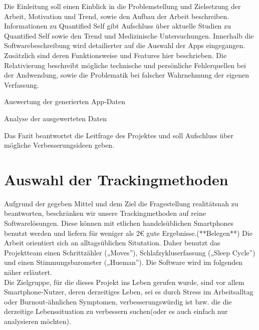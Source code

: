 Die Einleitung soll einen Einblick in die Problemstellung und Zielsetzung der Arbeit, Motivation und Trend, sowie den Aufbau der Arbeit beschreiben.
Informationen zu Quantified Self gibt Aufschluss über aktuelle Studien zu Quantified Self sowie den Trend und Medizinische Untersuchungen.
Innerhalb die Softwarebeschreibung wird detailierter auf die Auswahl der Apps eingegangen. \\
Zusätzlich sind deren Funktionsweise und Features hier beschrieben.
Die Relativierung beschreibt mögliche technische und persönliche Fehlerquellen bei der Andwendung, sowie die Problematik bei falscher Wahrnehmung der eigenen Verfassung.


Auswertung der generierten App-Daten


Analyse der ausgewerteten Daten


Das Fazit beantwortet die Leitfrage des Projektes und soll Aufschluss über mögliche Verbesserungsideen geben.

\section{Auswahl der Trackingmethoden}
\label{ch:Einleitung:sec:auswahl-der-trackingmethoden}

Aufgrund der gegeben Mittel und dem Ziel die Fragestellung realitätsnah zu beantworten, beschränken wir unsere Trackingmethoden auf reine Softwarelösungen. 
Diese können mit etlichen handelsüblichen Smartphones benutzt werden und liefern für weniger als 2\euro{} gute Ergebnisse.(**Belegen**) 
Die Arbeit orientiert sich an alltagsüblichen Situtation. 
Daher benutzt das Projektteam einen Schrittzähler („Moves”), Schlafzykluserfassung („Sleep Cycle”) und einen Stimmungsbarometer („Hueman”).
Die Software wird im folgenden näher erläutert. \\
Die Zielgruppe, für die dieses Projekt ins Leben gerufen wurde, sind vor allem Smartphone-Nutzer, deren derzeitiges Leben, sei es durch Stress im Arbeitsalltag oder Burnout-ähnlichen Symptomen, verbesserungswürdig ist bzw. die die derzeitige Lebenssituation zu verbessern suchen(oder es auch einfach nur analysieren möchten).  

